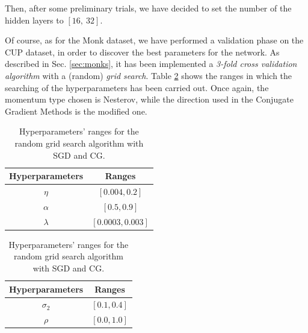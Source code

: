         Then, after some preliminary trials, we have decided to set the number of the hidden layers to $[16,\ 32]$.

        Of course, as for the Monk dataset, we have performed a validation phase on the CUP dataset, in order to
        discover the best parameters for the network. As described in Sec. \ref{sec:monks}, it has been
        implemented a \textit{3-fold cross validation algorithm} with a (random) \textit{grid search}.
        Table \ref{tab:hyper_cup} shows the ranges in which the searching of the hyperparameters has been carried
        out. Once again, the momentum type chosen is Nesterov, while the direction used in the Conjugate Gradient
        Methods is the modified one.

        \begin{table}[H]
          \centering
          \caption{Hyperparameters' ranges for the random grid search algorithm with SGD and CG.}
          \begin{minipage}{.4\textwidth}
              \centering
              \begin{tabular}{| c | c |}
                    \hline
                    Hyperparameters & Ranges\\
                    \hline
                    $\eta$ & $\left [0.004, 0.2\right ]$ \\
                    \hline
                    $\alpha$ & $[0.5, 0.9]$ \\
                    \hline
                    $\lambda$ & $[0.0003, 0.003]$ \\
                    \hline
              \end{tabular}
          \end{minipage}
          \begin{minipage}{.4\textwidth}
              \centering
              \begin{tabular}{| c | c |}
                    \hline
                    Hyperparameters & Ranges\\
                    \hline
                    $\sigma_2$ & $\left [0.1, 0.4 \right ]$\\
                    \hline
                    $\rho$ & $[0.0, 1.0]$ \\
                    \hline
              \end{tabular}
            \end{minipage}
            \label{tab:hyper_cup}
        \end{table}


